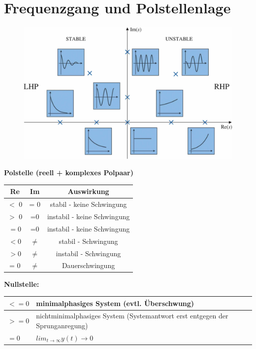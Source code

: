 \setcounter{section}{3}
\section{Frequenzgang und Polstellenlage}
\begin{tcolorbox}[colback=white!10!white,
                  colframe=green!30!black,
                  title=Auswirkung der NST und Polstellenlage] 
    \begin{figure}[H]
        \centering
        \includegraphics[width=1\textwidth]{images/lageAntwort}
    \end{figure}
    \tcblower
    \textbf{Polstelle (reell + komplexes Polpaar)}
    \begin{table}[H]
        \centering
        \begin{tabular}{ccc}
            \hline Re & Im & Auswirkung \\ 
            \hline $<$ 0 & = 0 & stabil - keine Schwingung \\ 
            \hline $>$ 0  & =0 & instabil - keine Schwingung \\ 
            \hline $=0$ & =0 & instabil - keine Schwingung \\ 
            \hline\hline $< 0$ & $\not =$ & stabil - Schwingung \\ 
            \hline $> 0$  &  $\not =$ & instabil - Schwingung \\ 
            \hline = 0  & $\not =$ & Dauerschwingung \\ 
            \hline 
        \end{tabular} 
    \end{table}
    \textbf{Nullstelle:}
    \begin{table}[H]
        \centering
        \begin{tabular}{p{2cm}p{3cm}}
            \hline $< = 0 $ & minimalphasiges System (evtl. Überschwung) \\ 
            \hline $> = 0 $ & nichtminimalphasiges System (Systemantwort erst entgegen der Sprunganregung) \\ 
            \hline $= 0 $ & $lim_{t\rightarrow\infty}y(t)\rightarrow 0$ \\ 
            \hline 
        \end{tabular} 
    \end{table}
\end{tcolorbox}

